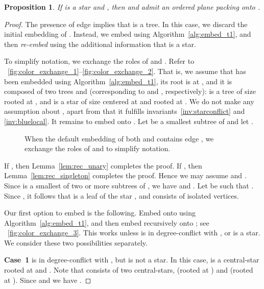 \documentclass[11pt,a4paper,colorlinks=true,urlcolor=blue,citecolor=red]{article}
\theoremstyle{plain}
\newtheorem{proposition}[theorem]{Proposition}
\newcommand{\case}[1]{\par\vspace{.5\baselineskip}\noindent\textbf{\sffamily Case~#1}}
\begin{document}
\begin{proposition}\label{prop:rec_large_red_star_ij_used}
  If  is a star and , then  and 
  admit an ordered plane packing onto .
\end{proposition}
\begin{proof}
  The presence of edge  implies that  is a tree. In
  this case, we discard the initial embedding of . Instead, we embed
   using Algorithm~\ref{alg:embed_t1}, and then \emph{re-embed} 
  using the additional information that  is a star.

  To simplify notation, we exchange the roles of  and . Refer to
  \figurename~\ref{fig:color_exchange_1}--\ref{fig:color_exchange_2}.
  That is, we assume that  has been embedded using
  Algorithm~\ref{alg:embed_t1}, its root is at , and it is composed
  of two trees  and  (corresponding to  and ,
  respectively):  is a tree of size  rooted at
  , and  is a star of size 
  centered at  and rooted at . We do not make any assumption
  about , apart from that it fulfills
  invariants~\ref{inv:starconflict} and \ref{inv:bluelocal}. It remains
  to embed  onto . Let  be a smallest subtree of  and
  let .

\begin{figure}[htbp]
  \centering\hfil {}\hfil {}\hfil {}\hfil \caption{When the default embedding of both  and  contains edge
    , we exchange the roles of  and  to simplify
    notation.\label{fig:color_exchange}}
\end{figure}

If , then Lemma~\ref{lem:rec_unary} completes the proof. If
, then Lemma~\ref{lem:rec_singleton} completes the proof. Hence
we may assume  and . Since  is a smallest
of two or more subtrees of , we have  and
. Let  be such that .
Since , it follows that  is a leaf of the
star , and  consists of isolated vertices.

Our first option to embed  is the following. Embed  onto 
using Algorithm~\ref{alg:embed_t1}, and then embed  recursively
onto ; see \figurename~\ref{fig:color_exchange_3}. This works
unless  is in degree-conflict with , or  is a star. We
consider these two possibilities separately.

\case{1}  is in degree-conflict with , but  is not a
star. In this case,  is a central-star
rooted at  and . Note that
 consists of two central-stars,  (rooted at )
and  (rooted at ). Since  and
 we have .


\end{proof}
\end{document}
